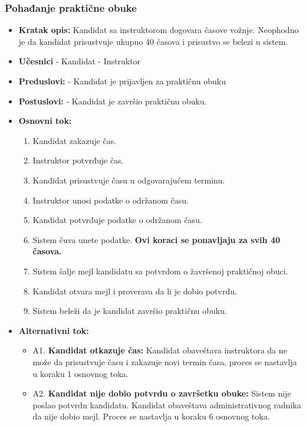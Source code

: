 \subsubsection{Pohađanje praktične obuke}

\vspace{3mm}

\begin{itemize}

\item \textbf{Kratak opis:} Kandidat sa instruktorom dogovara časove vožnje. Neophodno je da kandidat prisustvuje ukupno 40 časova i prisustvo se belezi u sistem.

\vspace{2mm}

\item \textbf{Učesnici} \newline
   - Kandidat \newline   
   - Instruktor 
   
\item \textbf{Preduslovi:} \newline
   - Kandidat je prijavljen za praktičnu obuku 

\item \textbf{Postuslovi:} \newline
    - Kandidat je završio praktičnu obuku.

\item \textbf{Osnovni tok:}  
   \begin{enumerate}
   \item Kandidat zakazuje čas.
   \item Instruktor potvrđuje čas.
   \item Kandidat prisustvuje času u odgovarajućem terminu.
   \item Instruktor unosi podatke o održanom času.
   \item Kandidat potvrđuje podatke o održanom času.
   \item Sistem čuva unete podatke. \newline
\textbf{Ovi koraci se ponavljaju za svih 40 časova.}
   \item Sistem šalje mejl kandidatu sa potvrdom o žavršenoj praktičnoj obuci.
   \item Kandidat otvara mejl i proverava da li je dobio potvrdu. 
   \item Sistem beleži da je kandidat završio praktičnu obuku.
   \end{enumerate}

\item \textbf{Alternativni tok:}  
   \begin{itemize}
   \item A1. \textbf{Kandidat otkazuje čas:}
  Kandidat obaveštava instruktora da ne može da prisustvuje času i zakazuje novi termin časa, proces se nastavlja u koraku 1 osnovnog toka.
  \item A2. \textbf{Kandidat nije dobio potvrdu o završetku obuke:}
  Sistem nije poslao potvrdu kandidatu. Kandidat obaveštava administrativnog radnika da nije dobio mejl. Proces se nastavlja u koraku 6 osnovnog toka.
   \end{itemize}

\end{itemize}

